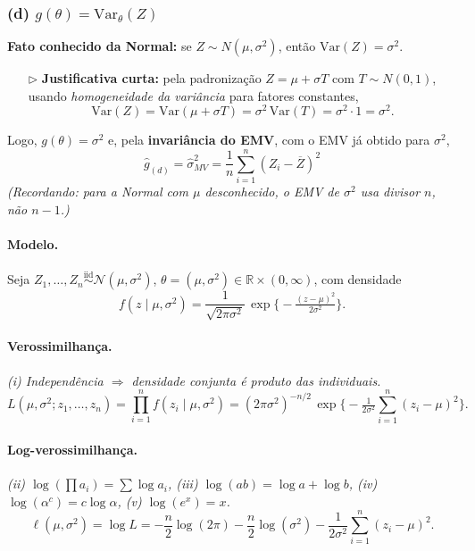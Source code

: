 \subsubsection*{(d) \; $g(\theta)=\mathrm{Var}_\theta(Z)$}

\textbf{Fato conhecido da Normal:} se $Z\sim N(\mu,\sigma^2)$, então $\mathrm{Var}(Z)=\sigma^2$.
\begin{itemize}
  \item[\(\triangleright\)] \textbf{Justificativa curta:} pela padronização $Z=\mu+\sigma T$ com $T\sim N(0,1)$,
  usando \emph{homogeneidade da variância} para fatores constantes,
  \[
  \mathrm{Var}(Z)=\mathrm{Var}(\mu+\sigma T)=\sigma^2\,\mathrm{Var}(T)=\sigma^2\cdot 1=\sigma^2 .
  \]
\end{itemize}
Logo, $g(\theta)=\sigma^2$ e, pela \textbf{invariância do EMV}, com o EMV já obtido para $\sigma^2$,
\[
\boxed{\;\widehat g_{(d)}=\widehat\sigma^2_{MV}=\frac{1}{n}\sum_{i=1}^n (Z_i-\overline Z)^2\;}
\]
\emph{(Recordando: para a Normal com $\mu$ desconhecido, o EMV de $\sigma^2$ usa divisor $n$, não $n-1$.)}



\paragraph{Modelo.}
Seja $Z_1,\ldots,Z_n \stackrel{\mathrm{iid}}{\sim}\mathcal N(\mu,\sigma^2)$, 
$\theta=(\mu,\sigma^2)\in\mathbb R\times(0,\infty)$, com densidade
\[
f(z\mid\mu,\sigma^2)=\frac{1}{\sqrt{2\pi\sigma^2}}\,
\exp\!\Big\{-\tfrac{(z-\mu)^2}{2\sigma^2}\Big\}.
\]

\paragraph{Verossimilhança.}
\emph{(i) Independência $\Rightarrow$ densidade conjunta é produto das individuais.}
\[
L(\mu,\sigma^2;z_1,\ldots,z_n)=\prod_{i=1}^n f(z_i\mid\mu,\sigma^2)
=(2\pi\sigma^2)^{-n/2}\,
\exp\!\Big\{-\tfrac{1}{2\sigma^2}\sum_{i=1}^n (z_i-\mu)^2\Big\}.
\]

\paragraph{Log-verossimilhança.}
\emph{(ii) $\log(\prod a_i)=\sum\log a_i$, (iii) $\log(ab)=\log a+\log b$,
(iv) $\log(\alpha^c)=c\log\alpha$, (v) $\log(e^x)=x$.}
\[
\ell(\mu,\sigma^2)=\log L
=-\frac{n}{2}\log(2\pi) - \frac{n}{2}\log(\sigma^2)
-\frac{1}{2\sigma^2}\sum_{i=1}^n (z_i-\mu)^2 .
\]

